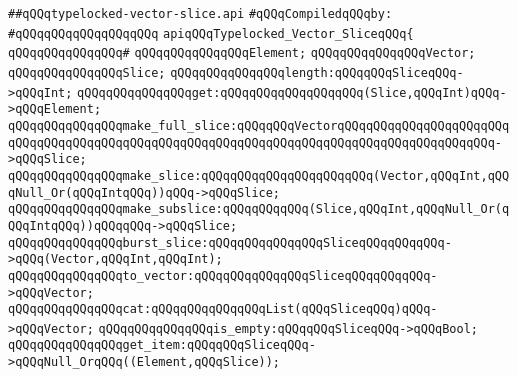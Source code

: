 \label{src/lib/std/src/typelocked-vector-slice.api}
\verb|##qQQqtypelocked-vector-slice.api|\newline
\newline
\verb|#qQQqCompiledqQQqby:|\newline
\verb|#qQQqqQQqqQQqqQQqqQQq|\newline
\newline
\newline
\newline
\verb|apiqQQqTypelocked_Vector_SliceqQQq{|\newline
\verb|qQQqqQQqqQQqqQQq#|\newline
\verb|qQQqqQQqqQQqqQQqElement;|\newline
\verb|qQQqqQQqqQQqqQQqVector;|\newline
\verb|qQQqqQQqqQQqqQQqSlice;|\newline
\newline
\verb|qQQqqQQqqQQqqQQqlength:qQQqqQQqSliceqQQq->qQQqInt;|\newline
\verb|qQQqqQQqqQQqqQQqget:qQQqqQQqqQQqqQQqqQQq(Slice,qQQqInt)qQQq->qQQqElement;|\newline
\newline
\verb|qQQqqQQqqQQqqQQqmake_full_slice:qQQqqQQqVectorqQQqqQQqqQQqqQQqqQQqqQQqqQQqqQQqqQQqqQQqqQQqqQQqqQQqqQQqqQQqqQQqqQQqqQQqqQQqqQQqqQQqqQQqqQQq->qQQqSlice;|\newline
\verb|qQQqqQQqqQQqqQQqmake_slice:qQQqqQQqqQQqqQQqqQQqqQQq(Vector,qQQqInt,qQQqNull_Or(qQQqIntqQQq))qQQq->qQQqSlice;|\newline
\verb|qQQqqQQqqQQqqQQqmake_subslice:qQQqqQQqqQQq(Slice,qQQqInt,qQQqNull_Or(qQQqIntqQQq))qQQqqQQq->qQQqSlice;|\newline
\newline
\verb|qQQqqQQqqQQqqQQqburst_slice:qQQqqQQqqQQqqQQqSliceqQQqqQQqqQQq->qQQq(Vector,qQQqInt,qQQqInt);|\newline
\verb|qQQqqQQqqQQqqQQqto_vector:qQQqqQQqqQQqqQQqSliceqQQqqQQqqQQq->qQQqVector;|\newline
\verb|qQQqqQQqqQQqqQQqcat:qQQqqQQqqQQqqQQqList(qQQqSliceqQQq)qQQq->qQQqVector;|\newline
\newline
\verb|qQQqqQQqqQQqqQQqis_empty:qQQqqQQqSliceqQQq->qQQqBool;|\newline
\verb|qQQqqQQqqQQqqQQqget_item:qQQqqQQqSliceqQQq->qQQqNull_OrqQQq((Element,qQQqSlice));|\newline
\newline
